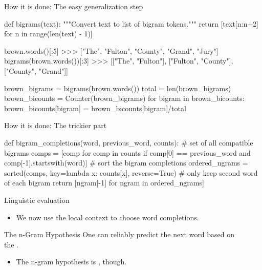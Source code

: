 \documentclass[professionalfonts, xcolor={usenames,svgnames,x11names,table}]{beamer}
\begin{document}
\begin{frame}[fragile]{How it is done: The easy generalization step}
    \begin{pythoncode}
        def bigrams(text):
            """Convert text to list of bigram tokens."""
            return [text[n:n+2] for n in range(len(text) - 1)]

        
        brown.words()[:5]
        >>> ["The", "Fulton", "County", "Grand", "Jury"]
        bigrams(brown.words())[:3]
        >>> [["The", "Fulton"], ["Fulton", "County"],
             ["County", "Grand"]]
    \end{pythoncode}

    \begin{pythoncode}
        brown_bigrams = bigrams(brown.words())
        total = len(brown_bigrams)
        brown_bicounts = Counter(brown_bigrams)
        for bigram in brown_bicounts:
            brown_bicounts[bigram] = brown_bicounts[bigram]/total
    \end{pythoncode}
\end{frame}

\begin{frame}[fragile]{How it is done: The trickier part}
    \begin{pythoncode}
        def bigram_completions(word, previous_word, counts):
            # set of all compatible bigrams
            comps = [comp for comp in counts
                     if comp[0] == previous_word and
                        comp[-1].startswith(word)]
            # sort the bigram completions
            ordered_ngrams = sorted(comps,
                                    key=lambda x: counts[x],
                                    reverse=True)
            # only keep second word of each bigram
            return [ngram[-1] for ngram in ordered_ngrams]
    \end{pythoncode}
\end{frame}

\begin{frame}{Linguistic evaluation}
    \begin{itemize}
        \item We now use the local context to choose word completions.
    \end{itemize}

    \begin{block}{The n-Gram Hypothesis}
        One can reliably predict the next word based on\\
        the .
    \end{block}

    \begin{itemize}
        \item The n-gram hypothesis is , though.
    \end{itemize}
\end{frame}
\end{document}
